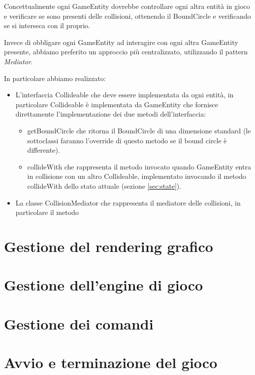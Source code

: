 \documentclass[a4paper,12pt]{article}
\begin{document}
Concettualmente ogni \textsf{GameEntity} dovrebbe controllare ogni altra entit\`a in gioco e verificare se sono presenti delle collisioni, ottenendo il \textsf{BoundCircle} e verificando se si interseca con il proprio.

Invece di obbligare ogni \textsf{GameEntity} ad interagire con ogni altra \textsf{GameEntity} presente, abbiamo preferito un approccio pi\`u centralizzato, utilizzando il pattern \emph{Mediator}.

In particolare abbiamo realizzato:
\begin{itemize}
\item L'interfaccia \textsf{Collideable} che deve essere implementata da ogni entit\`a, in particolare \textsf{Collideable} \`e implementata da \textsf{GameEntity} che fornisce direttamente l'implementazione dei due metodi dell'interfaccia:
\begin{itemize}
\item \textsf{getBoundCircle} che ritorna il \textsf{BoundCircle} di una dimensione standard (le sottoclassi faranno l'override di questo metodo se il bound circle \`e differente).
\item \textsf{collideWith} che rappresenta il metodo invocato quando \textsf{GameEntity} entra in collisione con un altro \textsf{Collideable}, implementato invocando il metodo \textsf{collideWith} dello stato attuale (sezione \ref{sec:state}).
\end{itemize}
\item La classe \textsf{CollisionMediator} che rappresenta il mediatore delle collisioni, in particolare il metodo 
\end{itemize}



\section{Gestione del rendering grafico}
\label{sec:graphics}

\section{Gestione dell'engine di gioco}
\label{sec:engine}

\section{Gestione dei comandi}
\label{sec:comandi}

\section{Avvio e terminazione del gioco}
\label{sec:avvio}
\end{document}
